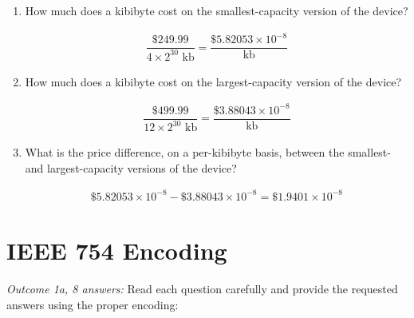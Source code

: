 \documentclass[11pt]{article}
\begin{document}
\begin{enumerate}
\begin{enumerate}
\item How much does a kibibyte cost on the smallest-capacity version of the device?

\begin{align*}
\dfrac{\$249.99}{4\times2^{30}\text{ kb}} = \boxed{\dfrac{\$5.82053\times10^{-8}}{\text{kb}}}
\end{align*}


\item How much does a kibibyte cost on the largest-capacity version of the device?

\begin{align*}
\dfrac{\$499.99}{12\times2^{30}\text{ kb}} = \boxed{\dfrac{\$3.88043\times10^{-8}}{\text{kb}}}
\end{align*}

\item What is the price difference, on a per-kibibyte basis, between the smallest-
and largest-capacity versions of the device?

\begin{align*}
\$5.82053\times10^{-8} - \$3.88043\times10^{-8} = \boxed{\$1.9401\times10^{-8}}
\end{align*}


\end{enumerate}

\end{enumerate}

\section{IEEE 754 Encoding}

\emph{Outcome 1a, 8 answers:} Read each question carefully and provide the requested answers using the
proper encoding:
\end{document}
